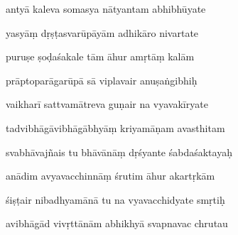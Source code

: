 \documentclass[article,12pt,a4paper]{memoir}%
\newcounter{parCount}
\begin{document}
	  
	  \pstart \leavevmode%
	antyā kaleva somasya nātyantam abhibhūyate 
	{}
	\pend%
      

	  
	  \pstart {} yasyāṃ dṛṣṭasvarūpāyām adhikāro nivartate 
	{}
	\pend%
      

	  
	  \pstart \leavevmode%
	puruṣe ṣoḍaśakale tām āhur amṛtāṃ kalām 
	{}
	\pend%
      

	  
	  \pstart {} prāptoparāgarūpā sā viplavair anuṣaṅgibhiḥ 
	{}
	\pend%
      

	  
	  \pstart \leavevmode%
	vaikharī sattvamātreva guṇair na vyavakīryate 
	{}
	\pend%
      

	  
	  \pstart {} tadvibhāgāvibhāgābhyāṃ kriyamāṇam avasthitam 
	{}
	\pend%
      

	  
	  \pstart \leavevmode%
	svabhāvajñais tu bhāvānāṃ dṛśyante śabdaśaktayaḥ 
	{}
	\pend%
      

	  
	  \pstart {} anādim avyavacchinnāṃ śrutim āhur akartṛkām 
	{}
	\pend%
      

	  
	  \pstart \leavevmode%
	śiṣṭair nibadhyamānā tu na vyavacchidyate smṛtiḥ 
	{}
	\pend%
      

	  
	  \pstart {} avibhāgād vivṛttānām abhikhyā svapnavac chrutau 
	{}
	\pend%
      
\end{document}
